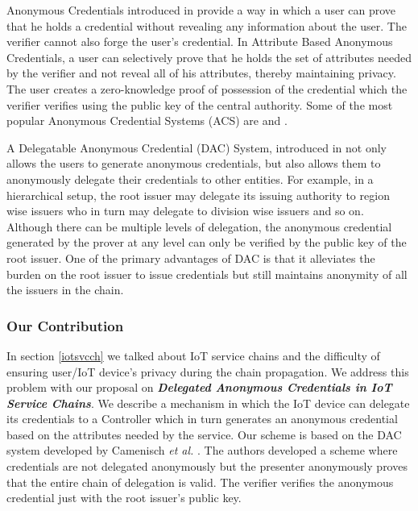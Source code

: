 \documentclass[journal]{IEEEtran}
\begin{document}
Anonymous Credentials introduced in \cite{chaum83blindsign} provide a way in which a user can prove that he holds a credential without revealing any information about the user. The verifier cannot also forge the user's credential. In Attribute Based Anonymous Credentials, a user can selectively prove that he holds the set of attributes needed by the verifier and not reveal all of his attributes, thereby maintaining privacy. The user creates a zero-knowledge proof of possession of the credential which the verifier verifies using the public key of the central authority. Some of the most popular Anonymous Credential Systems (ACS) are \cite{CamenischH02} and \citep{uprove}.

A Delegatable Anonymous Credential (DAC) System, introduced in \cite{delegatabledac} not only allows the users to generate anonymous credentials, but also allows them to anonymously delegate their credentials to other entities. For example, in a hierarchical setup, the root issuer may delegate its issuing authority to region wise issuers who in turn may delegate to division wise issuers and so on. Although there can be multiple levels of delegation, the anonymous credential generated by the prover at any level can only be verified by the public key of the root issuer.  One of the primary advantages of DAC is that it alleviates the burden on the root issuer to issue credentials but still maintains anonymity of all the issuers in the chain.

\subsubsection{Our Contribution}
In section \ref{iotsvcch} we talked about IoT service chains and the difficulty of ensuring user/IoT device's privacy during the chain propagation. We address this problem with our proposal on \textbf{\textit{Delegated Anonymous Credentials in IoT Service Chains}}. We describe a mechanism in which the IoT device can delegate its credentials to a Controller which in turn generates an anonymous credential based on the attributes needed by the service. Our scheme is based on the DAC system developed by Camenisch \textit{et al.} \cite{CamenischDD17}. The authors developed a scheme where credentials are not delegated anonymously but the presenter anonymously proves that the entire chain of delegation is valid. The verifier verifies the anonymous credential just with the root issuer's public key.
\end{document}
